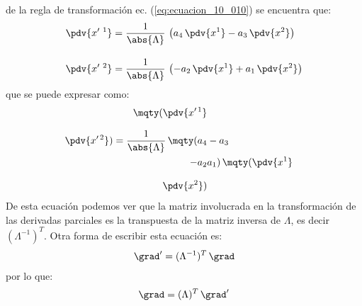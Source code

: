 de la regla de transformación ec. (\ref{eq:ecuacion_10_010}) se encuentra que:
\begin{align}
\begin{aligned}
\pdv{x^{\prime \ 1}} &= \dfrac{1}{\abs{\Lambda}} \, \left( a_{4} \, \pdv{x^{1}} - a_{3} \, \pdv{x^{2}} \right) \\[1em]
\pdv{x^{\prime \ 2}} &= \dfrac{1}{\abs{\Lambda}} \, \left( - a_{2} \, \pdv{x^{1}} + a_{1} \, \pdv{x^{2}} \right)
\end{aligned}
\label{eq:ecuacion_10_012}
\end{align}
que se puede expresar como:
\begin{align}
\mqty(\displaystyle \pdv{x^{\prime \, 1}} \\[0.75em] \displaystyle \pdv{x^{\prime \, 2}}) = \dfrac{1}{\abs{\Lambda}} \, \mqty(a_{4} & - a_{3} \\ - a_{2} & a_{1}) \, \mqty(\displaystyle \pdv{x^{1}} \\[0.75em] \displaystyle \pdv{x^{2}})
\label{eq:ecuacion_10_013}   
\end{align}
De esta ecuación podemos ver que la matriz involucrada en la transformación de las derivadas parciales es la transpuesta de la matriz inversa de $\Lambda$, es decir $(\Lambda^{-1})^{T}$. Otra forma de escribir esta ecuación es:
\begin{align}
\grad^{\prime} = (\Lambda^{-1})^{T} \, \grad
\label{eq:ecuacion_10_014}
\end{align}
por lo que:
\begin{align}
\grad = (\Lambda)^{T} \, \grad^{\prime}
\label{eq:ecuacion_10_015}
\end{align}

